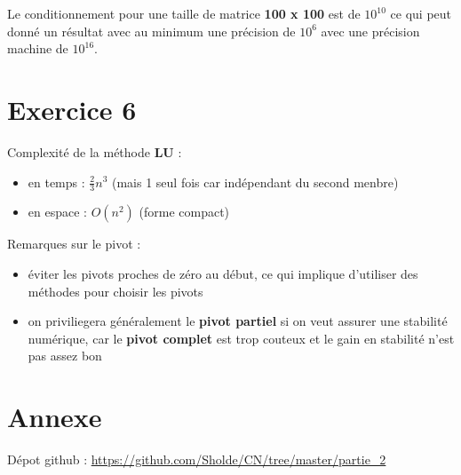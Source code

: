 \documentclass{article}
\begin{document}
Le conditionnement pour une taille de matrice \textbf{100 x 100} est
de $10^{10}$ ce qui peut donné un résultat avec au minimum une
précision de $10^{6}$ avec une précision machine de $10^{16}$.\newline

\section*{Exercice 6}

Complexité de la méthode \textbf{LU} :

\begin{itemize}
\item en temps  : $\frac{2}{3} n^3$ (mais 1 seul fois car indépendant
  du second menbre)
\item en espace : $O(n^2)$ (forme compact)
\end{itemize}

Remarques sur le pivot :

\begin{itemize}
\item éviter les pivots proches de zéro au début, ce qui implique
  d'utiliser des méthodes pour choisir les pivots
\item on priviliegera généralement le \textbf{pivot partiel} si on
  veut assurer une stabilité numérique, car le \textbf{pivot complet}
  est trop couteux et le gain en stabilité n'est pas assez bon
\end{itemize}


\section*{Annexe}

Dépot github : \url{https://github.com/Sholde/CN/tree/master/partie_2}
\end{document}
